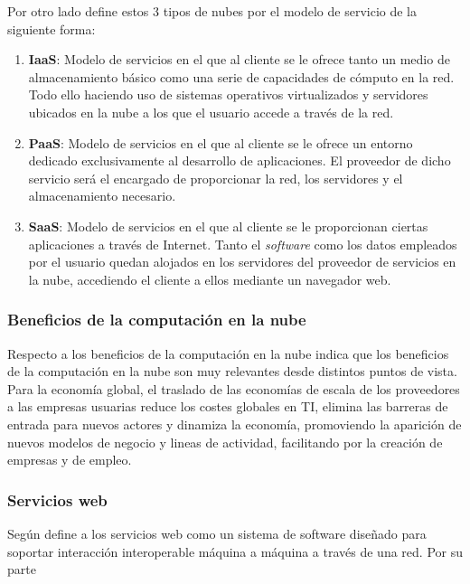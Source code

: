 Por otro lado \cite{msolutions} define estos 3 tipos de nubes por el modelo de servicio
de la siguiente forma:
\begin{enumerate}
    \item \textbf{IaaS}: Modelo de servicios en el que al cliente se le ofrece tanto un
          medio de almacenamiento básico como una serie de capacidades de cómputo en la red.
          Todo ello haciendo uso de sistemas operativos virtualizados y servidores ubicados
          en la nube a los que el usuario accede a través de la red.
    \item \textbf{PaaS}: Modelo de servicios en el que al cliente se le ofrece un entorno
          dedicado exclusivamente al desarrollo de aplicaciones. El proveedor de dicho servicio será
          el encargado de proporcionar la red, los servidores y el almacenamiento necesario.
    \item \textbf{SaaS}: Modelo de servicios en el que al cliente se le proporcionan ciertas aplicaciones
          a través de Internet. Tanto el \emph{software} como los datos empleados por el usuario
          quedan alojados en los servidores del proveedor de servicios en la nube, accediendo el cliente
          a ellos mediante un navegador web.
\end{enumerate}
\subsubsection{Beneficios de la computación en la nube}
Respecto a los beneficios de la computación en la nube \cite{cierco} indica que los beneficios
de la computación en la nube son muy relevantes desde distintos puntos de vista.
Para la economía global, el traslado de las economías de escala de los
proveedores a las empresas usuarias reduce los costes globales en TI, elimina
las barreras de entrada para nuevos actores y dinamiza la economía, promoviendo
la aparición de nuevos modelos de negocio y lineas de actividad, facilitando
por la creación de empresas y de empleo.
\subsubsection{Servicios web}

Según \cite{w3c} define a los servicios web como un sistema de software diseñado
para soportar interacción interoperable máquina a máquina a través de una red.
Por su parte
